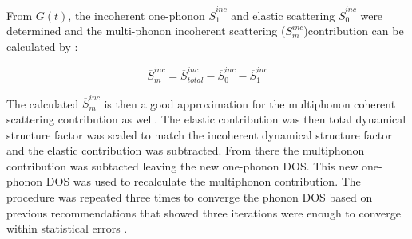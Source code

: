 \noindent From $G(t)$, the incoherent one-phonon $\overline{S}_{1}^{inc}$ and elastic scattering $\overline{S}_{0}^{inc}$ were determined and the multi-phonon incoherent scattering ($S_{m}^{inc}$)contribution can be calculated by \cite{Manley2001,Manley2002}:

\begin{equation}
\label{eq: S_inco}
\overline{S}_{m}^{inc} = \overline{S}_{total}^{inc}-\overline{S}_{0}^{inc}-\overline{S}_{1}^{inc}
\end{equation}

\noindent The calculated $\overline{S}_{m}^{inc}$ is then a good approximation for the multiphonon coherent scattering contribution as well. The elastic contribution was then total dynamical structure factor was scaled to match the incoherent dynamical structure factor and the elastic contribution was subtracted. From there the multiphonon contribution was subtacted leaving the new one-phonon DOS. This new one-phonon DOS was used to recalculate the multiphonon contribution. The procedure was repeated three times to converge the phonon DOS based on previous recommendations that showed three iterations were enough to converge within statistical errors \cite{Manley2001,Manley2002}.